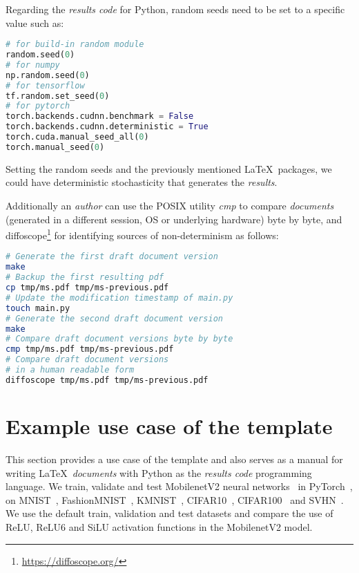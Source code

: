 \documentclass[journal]{IEEEtran}
\begin{document}
Regarding the \textit{results code} for Python, random seeds need to be set to a specific value such as:
\begin{lstlisting}[language=python, style=lststyle, caption={Python reproducibility commands for some popular libraries.}]
# for build-in random module
random.seed(0)
# for numpy
np.random.seed(0)
# for tensorflow
tf.random.set_seed(0)
# for pytorch
torch.backends.cudnn.benchmark = False
torch.backends.cudnn.deterministic = True
torch.cuda.manual_seed_all(0)
torch.manual_seed(0)
\end{lstlisting}

Setting the random seeds and the previously mentioned \LaTeX\ packages, we could have deterministic stochasticity that generates the \textit{results}.

Additionally an \textit{author} can use the POSIX utility \textit{cmp} to compare \textit{documents} (generated in a different session, OS or underlying hardware) byte by byte, and diffoscope\footnote{\url{https://diffoscope.org/}} for identifying sources of non-determinism as follows:
\begin{lstlisting}[language=bash, style=lststyle, caption={Test draft document version reproducibility. This can also be used as a test script for pushed commits and pull requests to a remote repository.}]
# Generate the first draft document version
make
# Backup the first resulting pdf
cp tmp/ms.pdf tmp/ms-previous.pdf
# Update the modification timestamp of main.py
touch main.py
# Generate the second draft document version
make
# Compare draft document versions byte by byte
cmp tmp/ms.pdf tmp/ms-previous.pdf
# Compare draft document versions
# in a human readable form
diffoscope tmp/ms.pdf tmp/ms-previous.pdf
\end{lstlisting}

\section{Example use case of the template}
This section provides a use case of the template and also serves as a manual for writing \LaTeX\ \textit{documents} with Python as the \textit{results code} programming language.
We train, validate and test MobilenetV2 neural networks~\cite{sandler2018mobilenetv2} in PyTorch~\cite{paszke2019pytorch}, on MNIST~\cite{lecun2010mnist}, FashionMNIST~\cite{xiao2017fashion}, KMNIST~\cite{clanuwat2018deep}, CIFAR10~\cite{krizhevsky2009learning}, CIFAR100~\cite{krizhevsky2009learning} and SVHN~\cite{netzer2011reading}.
We use the default train, validation and test datasets and compare the use of ReLU, ReLU6\cite{dahl2013improving} and SiLU\cite{elfwing2018sigmoid} activation functions in the MobilenetV2 model.
\end{document}
